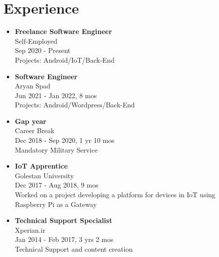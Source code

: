 \section*{\LARGE{Experience}}
\begin{itemize}
    \item \large{\textbf{Freelance Software Engineer}\\Self-Employed\\}\normalsize{Sep 2020 - Present\\Projects: Android/IoT/Back-End}
    \item \large{\textbf{Software Engineer}\\Aryan Spad\\}\normalsize{Jun 2021 - Jan 2022, 8 mos\\Projects: Android/Wordpress/Back-End}
    \item \large{\textbf{Gap year}\\Career Break\\}\normalsize{Dec 2018 - Sep 2020}, 1 yr 10 mos\\ Mandatory Military Service
    \item \large{\textbf{IoT Apprentice}\\Golestan University\\}\normalsize{Dec 2017 - Aug 2018, 9 mos\\Worked on a project developing a platform for devices in IoT using Raspberry Pi as a Gateway}
    \item \large{\textbf{Technical Support Specialist}\\Xperian.ir\\}\normalsize{Jan 2014 - Feb 2017, 3 yrs 2 mos\\Technical Support and content creation}
\end{itemize}
